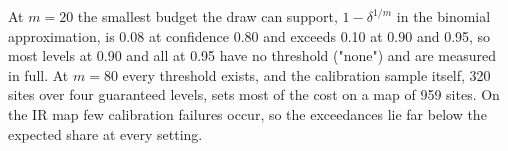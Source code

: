 \documentclass{iopjournal}
\begin{document}
At \(m = 20\) the smallest budget the draw can support, \(1 - \delta^{1/m}\) in the binomial approximation, is 0.08 at confidence 0.80 and exceeds 0.10 at 0.90 and 0.95, so most levels at 0.90 and all at 0.95 have no threshold ("none") and are measured in full. At \(m = 80\) every threshold exists, and the calibration sample itself, 320 sites over four guaranteed levels, sets most of the cost on a map of 959 sites. On the IR map few calibration failures occur, so the exceedances lie far below the expected share at every setting.



\end{document}
